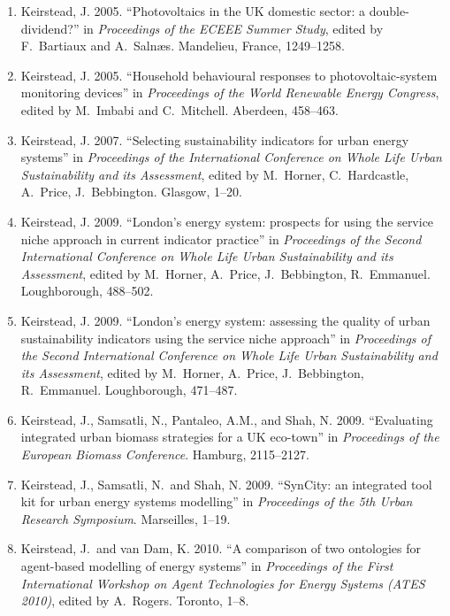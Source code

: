 \documentclass[11pt,a4paper]{article}
\begin{document}
\begin{enumerate}

\item Keirstead, J. 2005. ``Photovoltaics in the UK domestic sector: a double-dividend?'' in \emph{Proceedings of the ECEEE Summer Study}, edited by F.\ Bartiaux and A.\ Saln{\ae}s. Mandelieu, France, 1249--1258.

\item Keirstead, J. 2005. ``Household behavioural responses to photovoltaic-system monitoring devices'' in \emph{Proceedings of the World Renewable Energy Congress}, edited by M.\ Imbabi and C.\ Mitchell. Aberdeen, 458--463.

\item Keirstead, J. 2007. ``Selecting sustainability indicators for urban energy systems'' in \emph{Proceedings of the International Conference on Whole Life Urban Sustainability and its Assessment}, edited by M.\ Horner, C.\ Hardcastle, A.\ Price, J.\ Bebbington. Glasgow, 1--20.

\item Keirstead, J. 2009. ``London's energy system: prospects for using the service niche approach in current indicator practice'' in \emph{Proceedings of the Second International Conference on Whole Life Urban Sustainability and its Assessment}, edited by M.\ Horner, A.\ Price, J.\ Bebbington, R.\ Emmanuel.  Loughborough, 488--502.

\item Keirstead, J. 2009. ``London's energy system: assessing the quality of urban sustainability indicators using the service niche approach'' in \emph{Proceedings of the Second International Conference on Whole Life Urban Sustainability and its Assessment}, edited by M.\ Horner, A.\ Price, J.\ Bebbington, R.\ Emmanuel.  Loughborough, 471--487.

\item Keirstead, J., Samsatli, N., Pantaleo, A.M., and Shah, N. 2009. ``Evaluating integrated urban biomass strategies for a UK eco-town'' in \emph{Proceedings of the European Biomass Conference}.  Hamburg, 2115--2127.

\item Keirstead, J., Samsatli, N.\  and Shah, N. 2009. ``SynCity: an integrated tool kit for urban energy systems modelling'' in \emph{Proceedings of the 5th Urban Research Symposium}.  Marseilles, 1--19.

\item Keirstead, J.\  and van Dam, K. 2010. ``A comparison of two ontologies for agent-based modelling of energy systems'' in \emph{Proceedings of the First International Workshop on Agent Technologies for Energy Systems (ATES 2010)}, edited by A.\ Rogers. Toronto, 1--8. 


\end{enumerate}
\end{document}
